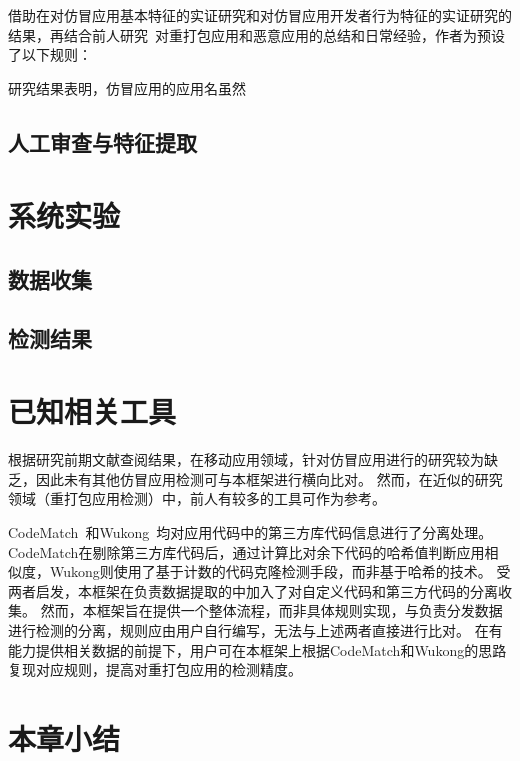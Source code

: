 借助在对仿冒应用基本特征的实证研究和对仿冒应用开发者行为特征的实证研究的结果，再结合前人研究~\cite{enck2009lightweight, khanmohammadi2019empirical, CodeMatch}对重打包应用和恶意应用的总结和日常经验，作者为\componentC 预设了以下规则：


研究结果表明，仿冒应用的应用名虽然


\subsection{人工审查与特征提取}
\section{系统实验}
\subsection{数据收集}
\subsection{检测结果}

\section{已知相关工具}

根据研究前期文献查阅结果，在移动应用领域，针对仿冒应用进行的研究较为缺乏，因此未有其他仿冒应用检测可与本框架进行横向比对。
然而，在近似的研究领域（重打包应用检测）中，前人有较多的工具可作为参考。

CodeMatch~\cite{CodeMatch}和Wukong~\cite{Wukong}均对应用代码中的第三方库代码信息进行了分离处理。
CodeMatch在剔除第三方库代码后，通过计算比对余下代码的哈希值判断应用相似度，Wukong则使用了基于计数的代码克隆检测手段，而非基于哈希的技术。
受两者启发，本框架在负责数据提取的\componentB 中加入了对自定义代码和第三方代码的分离收集。
然而，本框架旨在提供一个整体流程，而非具体规则实现，\componentB 与负责分发数据进行检测的\componentC 分离，规则应由用户自行编写，无法与上述两者直接进行比对。
在\componentB 有能力提供相关数据的前提下，用户可在本框架上根据CodeMatch和Wukong的思路复现对应规则，提高对重打包应用的检测精度。

\section{本章小结}

